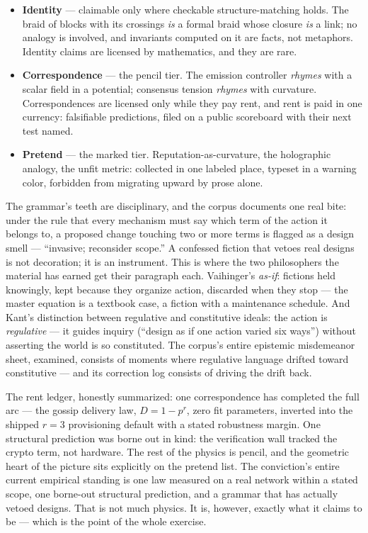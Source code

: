 \documentclass[10pt,a4paper]{article}
\begin{document}
\begin{itemize}[leftmargin=1.6em,itemsep=3pt]
\item \textbf{Identity} — claimable only where checkable structure-matching holds.
The braid of blocks with its crossings \emph{is} a formal braid whose closure
\emph{is} a link; no analogy is involved, and invariants computed on it are facts,
not metaphors. Identity claims are licensed by mathematics, and they are rare.
\item \textbf{Correspondence} — the pencil tier. The emission controller
\emph{rhymes} with a scalar field in a potential; consensus tension \emph{rhymes}
with curvature. Correspondences are licensed only while they pay rent, and rent is
paid in one currency: falsifiable predictions, filed on a public scoreboard with
their next test named.
\item \textbf{Pretend} — the marked tier. Reputation-as-curvature, the holographic
analogy, the unfit metric: collected in one labeled place, typeset in a warning
color, forbidden from migrating upward by prose alone.
\end{itemize}

The grammar's teeth are disciplinary, and the corpus documents one real bite: under
the rule that every mechanism must say which term of the action it belongs to, a
proposed change touching two or more terms is flagged as a design smell —
``invasive; reconsider scope.'' A confessed fiction that vetoes real designs is not
decoration; it is an instrument. This is where the two philosophers the material
has earned get their paragraph each. Vaihinger's \emph{as-if}: fictions held
knowingly, kept because they organize action, discarded when they stop — the
master equation is a textbook case, a fiction with a maintenance schedule. And
Kant's distinction between regulative and constitutive ideals: the action is
\emph{regulative} — it guides inquiry (``design as if one action varied six
ways'') without asserting the world is so constituted. The corpus's entire
epistemic misdemeanor sheet, examined, consists of moments where regulative
language drifted toward constitutive — and its correction log consists of driving
the drift back.

The rent ledger, honestly summarized: one correspondence has completed the full
arc — the gossip delivery law, $D=1-p^r$, zero fit parameters, inverted into the
shipped $r{=}3$ provisioning default with a stated robustness margin. One
structural prediction was borne out in kind: the verification wall tracked the
crypto term, not hardware. The rest of the physics is pencil, and the geometric
heart of the picture sits explicitly on the pretend list. The conviction's entire
current empirical standing is one law measured on a real network within a stated
scope, one borne-out structural
prediction, and a grammar that has actually vetoed designs. That is not much
physics. It is, however, exactly what it claims to be — which is the point of the
whole exercise.
\end{document}
